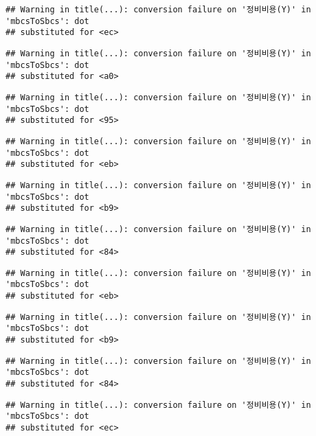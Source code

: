 \documentclass[
]{article}
\begin{document}
\begin{verbatim}
## Warning in title(...): conversion failure on '정비비용(Y)' in 'mbcsToSbcs': dot
## substituted for <ec>
\end{verbatim}

\begin{verbatim}
## Warning in title(...): conversion failure on '정비비용(Y)' in 'mbcsToSbcs': dot
## substituted for <a0>
\end{verbatim}

\begin{verbatim}
## Warning in title(...): conversion failure on '정비비용(Y)' in 'mbcsToSbcs': dot
## substituted for <95>
\end{verbatim}

\begin{verbatim}
## Warning in title(...): conversion failure on '정비비용(Y)' in 'mbcsToSbcs': dot
## substituted for <eb>
\end{verbatim}

\begin{verbatim}
## Warning in title(...): conversion failure on '정비비용(Y)' in 'mbcsToSbcs': dot
## substituted for <b9>
\end{verbatim}

\begin{verbatim}
## Warning in title(...): conversion failure on '정비비용(Y)' in 'mbcsToSbcs': dot
## substituted for <84>
\end{verbatim}

\begin{verbatim}
## Warning in title(...): conversion failure on '정비비용(Y)' in 'mbcsToSbcs': dot
## substituted for <eb>
\end{verbatim}

\begin{verbatim}
## Warning in title(...): conversion failure on '정비비용(Y)' in 'mbcsToSbcs': dot
## substituted for <b9>
\end{verbatim}

\begin{verbatim}
## Warning in title(...): conversion failure on '정비비용(Y)' in 'mbcsToSbcs': dot
## substituted for <84>
\end{verbatim}

\begin{verbatim}
## Warning in title(...): conversion failure on '정비비용(Y)' in 'mbcsToSbcs': dot
## substituted for <ec>
\end{verbatim}
\end{document}
